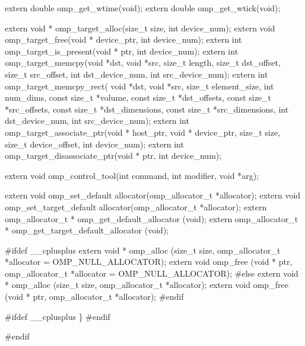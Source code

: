 {\begin{codepar}
extern double omp\_get\_wtime(void);
extern double omp\_get\_wtick(void);

extern void * omp\_target\_alloc(size\_t size, int device\_num);
extern void omp\_target\_free(void * device\_ptr, int device\_num);
extern int omp\_target\_is\_present(void * ptr, int device\_num);
extern int omp\_target\_memcpy(void *dst, void *src, size\_t length,
                              size\_t dst\_offset, size\_t src\_offset,
                              int dst\_device\_num, int src\_device\_num);
extern int omp\_target\_memcpy\_rect(
    void *dst, void *src,
    size\_t element\_size,
    int num\_dims,
    const size\_t *volume,
    const size\_t *dst\_offsets,
    const size\_t *src\_offsets,
    const size\_t *dst\_dimensions,
    const size\_t *src\_dimensions,
    int dst\_device\_num, int src\_device\_num);
extern int omp\_target\_associate\_ptr(void * host\_ptr,
                                       void * device\_ptr,
                                       size\_t size,
                                       size\_t device\_offset,
                                       int device\_num);
extern int omp\_target\_disassociate\_ptr(void * ptr,
                                          int device\_num);

extern void omp\_control\_tool(int command, int modifier, void *arg);

extern void omp\_set\_default allocator(omp\_allocator\_t *allocator);
extern void omp\_set\_target\_default allocator(omp\_allocator\_t *allocator);
extern omp\_allocator\_t * omp\_get\_default\_allocator (void);
extern omp\_allocator\_t * omp\_get\_target\_default\_allocator (void);

\#ifdef _\_cplusplus
extern void * omp\_alloc (size\_t size, 
                          omp\_allocator\_t *allocator = OMP\_NULL\_ALLOCATOR);
extern void omp\_free (void * ptr, 
                       omp\_allocator\_t *allocator = OMP\_NULL\_ALLOCATOR);
\#else
extern void * omp\_alloc (size\_t size, omp\_allocator\_t *allocator);
extern void omp\_free (void * ptr, omp\_allocator\_t *allocator);
\#endif


\#ifdef _\_cplusplus
\}
\#endif

\#endif
\end{codepar}} %

\pagebreak
